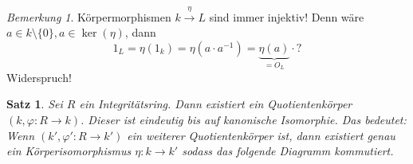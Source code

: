 \documentclass[a4paper,12pt,numbers=noenddot,parskip=full]{scrartcl}
\theoremstyle{dotless}
\newtheorem{theorem}{Satz}[section]
\theoremstyle{remark}
\newtheorem*{remark}{Bemerkung}
\begin{document}
	\begin{remark}
		Körpermorphismen $k \overset{\eta}{\to} L$ sind immer injektiv! Denn wäre $a \in k \setminus \{0\}, a \in \ker(\eta)$, dann
		\begin{equation*}
			1_L = \eta(1_k) = \eta(a \cdot a^{-1}) = \underbrace{\eta(a)}_{= O_L} \cdot ?
		\end{equation*} 
		Widerspruch!
	\end{remark}

	\begin{theorem}
		Sei $R$ ein Integritätsring. Dann existiert ein Quotientenkörper $(k, \varphi: R \to k)$. Dieser ist eindeutig bis auf kanonische Isomorphie. Das bedeutet: Wenn $(k', \varphi': R \to k')$ ein weiterer Quotientenkörper ist, dann existiert genau ein Körperisomorphismus $\eta: k \to k'$ sodass das folgende Diagramm kommutiert.
		
		\begin{center}
		\end{center}
	\end{theorem}
\end{document}

